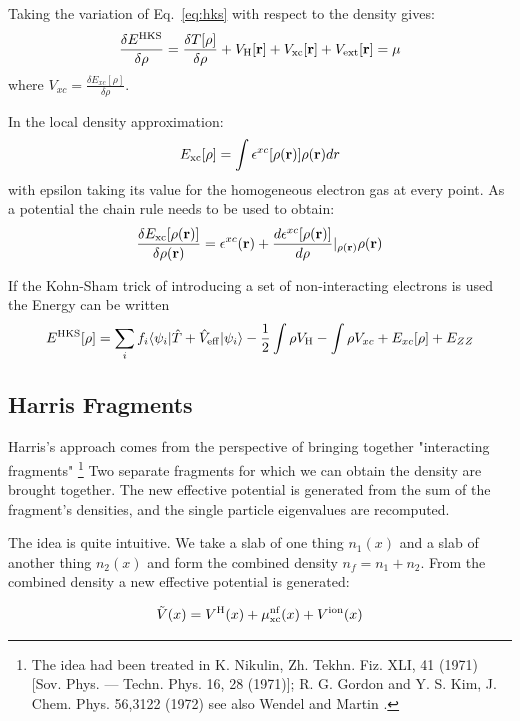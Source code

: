 Taking the variation of Eq.~\ref{eq:hks} with respect to the density gives:
%
\begin{equation}
\frac{\delta E^{\rm HKS}}{\delta \rho} = \frac{\delta T[\rho]}{\delta \rho} + V_{\rm H}[{\bf r}] + V_{\rm xc}[{\bf r}] + V_{\rm ext}[{\bf r}] = \mu
\end{equation}
%
where $V_{xc} = \frac{\delta E_{xc}[\rho]}{\delta \rho}$.

In the local density approximation:
%
\begin{equation}
E_{\rm xc}[\rho] = \int\epsilon^{xc}[\rho({\bf r})]\rho({\bf r})dr
\end{equation}
%
with epsilon taking its value for the homogeneous electron gas at 
every point. As a potential the chain rule needs to be used to obtain:
%
\begin{equation}
\frac{\delta E_{\rm xc}[\rho({\bf r})]}{\delta \rho({\bf r})} = \epsilon^{xc}({\bf r}) + \frac{d \epsilon^{xc}[\rho({\bf r})]}{d\rho}|_{\rho({\bf r})}\rho({\bf r})
\end{equation}
%

If the Kohn-Sham trick of introducing a set of non-interacting electrons is used the Energy can be written
%
\begin{equation}
E^{\rm HKS}[\rho] = \sum_{i}f_{i}\langle \psi_{i}|\hat{T} + \hat{V}_{\rm eff}|\psi_{i}\rangle - \frac{1}{2}\int\rho V_{\rm H} - \int\rho V_{xc} + E_{xc}[\rho] + E_{ZZ}
\end{equation}

\subsection{Harris Fragments}
Harris's approach \cite{harris85} comes from the perspective of bringing together 
"interacting fragments" \footnote{The idea had been treated in K. Nikulin, Zh. Tekhn. Fiz. XLI, 41 (1971) 
[Sov. Phys. — Techn. Phys. 16, 28 (1971)]; R. G. Gordon and Y. S. Kim, J. Chem. Phys. 56,3122 (1972)
see also Wendel and Martin \cite{wenel79}. }
Two separate fragments for which we can obtain the density are brought together. 
The new effective potential is generated from the sum of the fragment's densities, 
and the single particle eigenvalues are recomputed.

The idea is quite intuitive. We take a slab of one thing $n_{1}(x)$ 
and a slab of another thing $n_{2}(x)$ and form the combined density 
$n_{f}= n_1 + n_2$. From the combined density a new effective potential
is generated:

\begin{equation}
\tilde{V}(x) = V^{\rm H}(x) + \mu^{\rm nf}_{\rm xc}(x) + V^{\rm ion}(x)
\end{equation}

